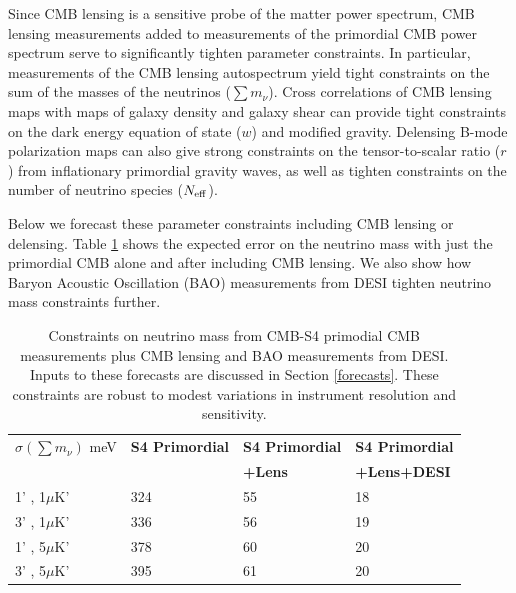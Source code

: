 Since CMB lensing is a sensitive probe of the matter power spectrum, CMB lensing measurements added to measurements of the primordial CMB power spectrum serve to significantly tighten parameter constraints.  In particular, measurements of the CMB lensing autospectrum yield tight constraints on the sum of the masses of the neutrinos ($\sum {m_\nu}$).  Cross correlations of CMB lensing maps with maps of galaxy density and galaxy shear can provide tight constraints on the dark energy equation of state ($w$) and modified gravity.  Delensing B-mode polarization maps can also give strong constraints on the tensor-to-scalar ratio ($r$) from inflationary primordial gravity waves, as well as tighten constraints on the number of neutrino species ($N_{\rm{eff}}$).  

Below we forecast these parameter constraints including CMB lensing or delensing.  Table \ref{neutrinoTable} shows the expected error on the neutrino mass with just the primordial CMB alone and after including CMB lensing. We also show how Baryon Acoustic Oscillation (BAO) measurements from DESI tighten neutrino mass constraints further.  

\begin{table}[htbp]
\centering
\caption{Constraints on neutrino mass from CMB-S4 primodial CMB measurements plus CMB lensing and BAO measurements from DESI.  Inputs to these forecasts are discussed in Section \ref{forecasts}.  These constraints are robust to modest variations in instrument resolution and sensitivity.\vspace{0.2cm}}
\label{neutrinoTable}
\begin{tabular}{|l|l|l|l|}
\hline
$\sigma(\sum m_{\nu})$ meV & \textbf{S4 Primordial} & \textbf{S4 Primordial} & \textbf{S4 Primordial} \\
&                         &  \textbf{+Lens} & \textbf{+Lens+DESI} \\ \hline
1' , 1$\mu$K'              & 324         & 55               & 18                    \\ \hline
3' , 1$\mu$K'              & 336         & 56               & 19                    \\ \hline
1' , 5$\mu$K'              & 378         & 60               & 20                    \\ \hline
3' , 5$\mu$K'              & 395         & 61               & 20                    \\ \hline
\end{tabular}
\end{table}


